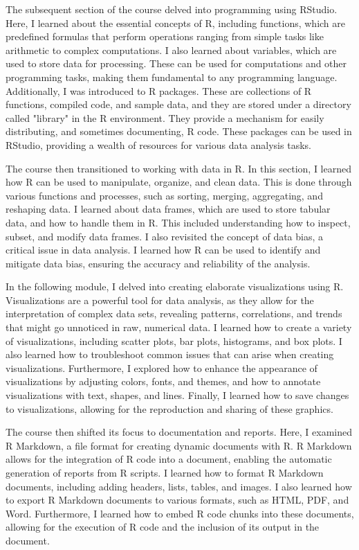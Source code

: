 \documentclass[]{article}
\begin{document}
The subsequent section of the course delved into programming using RStudio. Here, I learned about the essential concepts of R, including functions, which are predefined formulas that perform operations ranging from simple tasks like arithmetic to complex computations. I also learned about variables, which are used to store data for processing. These can be used for computations and other programming tasks, making them fundamental to any programming language. Additionally, I was introduced to R packages. These are collections of R functions, compiled code, and sample data, and they are stored under a directory called "library" in the R environment. They provide a mechanism for easily distributing, and sometimes documenting, R code. These packages can be used in RStudio, providing a wealth of resources for various data analysis tasks.

The course then transitioned to working with data in R. In this section, I learned how R can be used to manipulate, organize, and clean data. This is done through various functions and processes, such as sorting, merging, aggregating, and reshaping data. I learned about data frames, which are used to store tabular data, and how to handle them in R. This included understanding how to inspect, subset, and modify data frames. I also revisited the concept of data bias, a critical issue in data analysis. I learned how R can be used to identify and mitigate data bias, ensuring the accuracy and reliability of the analysis.

In the following module, I delved into creating elaborate visualizations using R. Visualizations are a powerful tool for data analysis, as they allow for the interpretation of complex data sets, revealing patterns, correlations, and trends that might go unnoticed in raw, numerical data. I learned how to create a variety of visualizations, including scatter plots, bar plots, histograms, and box plots. I also learned how to troubleshoot common issues that can arise when creating visualizations. Furthermore, I explored how to enhance the appearance of visualizations by adjusting colors, fonts, and themes, and how to annotate visualizations with text, shapes, and lines. Finally, I learned how to save changes to visualizations, allowing for the reproduction and sharing of these graphics.

The course then shifted its focus to documentation and reports. Here, I examined R Markdown, a file format for creating dynamic documents with R. R Markdown allows for the integration of R code into a document, enabling the automatic generation of reports from R scripts. I learned how to format R Markdown documents, including adding headers, lists, tables, and images. I also learned how to export R Markdown documents to various formats, such as HTML, PDF, and Word. Furthermore, I learned how to embed R code chunks into these documents, allowing for the execution of R code and the inclusion of its output in the document.
\end{document}
